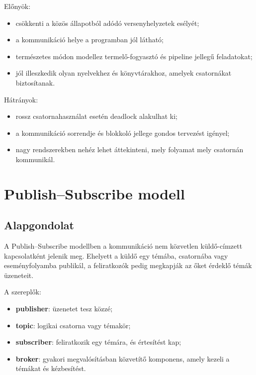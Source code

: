 Előnyök:

\begin{itemize}
  \item csökkenti a közös állapotból adódó versenyhelyzetek esélyét;
  \item a kommunikáció helye a programban jól látható;
  \item természetes módon modellez termelő-fogyasztó és pipeline jellegű feladatokat;
  \item jól illeszkedik olyan nyelvekhez és könyvtárakhoz, amelyek csatornákat biztosítanak.
\end{itemize}

Hátrányok:

\begin{itemize}
  \item rossz csatornahasználat esetén deadlock alakulhat ki;
  \item a kommunikáció sorrendje és blokkoló jellege gondos tervezést igényel;
  \item nagy rendszerekben nehéz lehet áttekinteni, mely folyamat mely csatornán kommunikál.
\end{itemize}

\section{Publish--Subscribe modell}

\subsection{Alapgondolat}

A Publish--Subscribe modellben a kommunikáció nem közvetlen küldő-címzett kapcsolatként jelenik meg. Ehelyett a küldő egy témába, csatornába vagy eseményfolyamba publikál, a feliratkozók pedig megkapják az őket érdeklő témák üzeneteit.

A szereplők:

\begin{itemize}
  \item \textbf{publisher}: üzenetet tesz közzé;
  \item \textbf{topic}: logikai csatorna vagy témakör;
  \item \textbf{subscriber}: feliratkozik egy témára, és értesítést kap;
  \item \textbf{broker}: gyakori megvalósításban közvetítő komponens, amely kezeli a témákat és kézbesítést.
\end{itemize}

